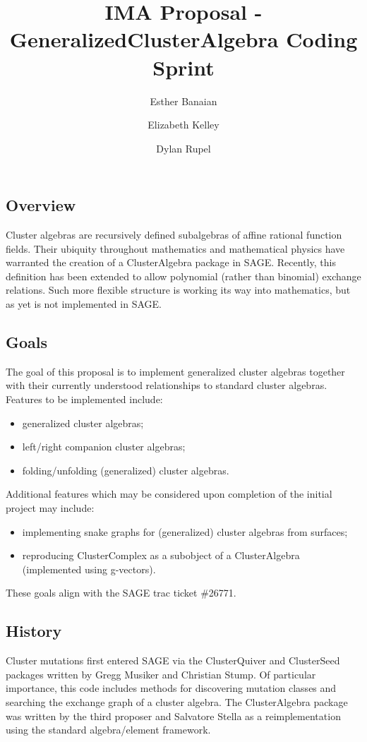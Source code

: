 \documentclass{amsart}
\title{IMA Proposal - GeneralizedClusterAlgebra Coding Sprint}
\author{Esther Banaian}
\author{Elizabeth Kelley}
\author{Dylan Rupel}
\begin{document}
  \maketitle

  \subsection*{Overview}
  Cluster algebras are recursively defined subalgebras of affine rational function fields.
  Their ubiquity throughout mathematics and mathematical physics have warranted the creation of a ClusterAlgebra package in SAGE.
  Recently, this definition has been extended to allow polynomial (rather than binomial) exchange relations.
  Such more flexible structure is working its way into mathematics, but as yet is not implemented in SAGE.

  \subsection*{Goals}
  The goal of this proposal is to implement generalized cluster algebras together with their currently understood relationships to standard cluster algebras.
  Features to be implemented include:
  \begin{itemize}
    \item generalized cluster algebras;
    \item left/right companion cluster algebras;
    \item folding/unfolding (generalized) cluster algebras.
  \end{itemize}
  Additional features which may be considered upon completion of the initial project may include:
  \begin{itemize}
    \item implementing snake graphs for (generalized) cluster algebras from surfaces;
    \item reproducing ClusterComplex as a subobject of a ClusterAlgebra (implemented using g-vectors).
  \end{itemize}
  These goals align with the SAGE trac ticket \#26771.

  \subsection*{History}
  Cluster mutations first entered SAGE via the ClusterQuiver and ClusterSeed packages written by Gregg Musiker and Christian Stump.  
  Of particular importance, this code includes methods for discovering mutation classes and searching the exchange graph of a cluster algebra.
  The ClusterAlgebra package was written by the third proposer and Salvatore Stella as a reimplementation using the standard algebra/element framework.
\end{document}
